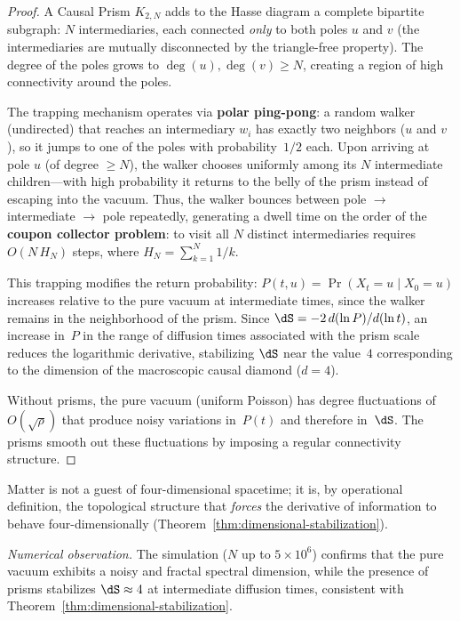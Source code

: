 \begin{proof}
A Causal Prism $K_{2,N}$ adds to the Hasse diagram a complete
bipartite subgraph: $N$ intermediaries, each connected
\emph{only} to both poles $u$ and $v$ (the intermediaries are
mutually disconnected by the triangle-free property). The
degree of the poles grows to $\deg(u), \deg(v) \geq N$, creating a
region of high connectivity around the poles.

The trapping mechanism operates via \textbf{polar ping-pong}:
a random walker (undirected) that reaches an intermediary
$w_i$ has exactly two neighbors ($u$ and $v$), so it jumps to
one of the poles with probability~$1/2$ each. Upon arriving at pole
$u$ (of degree $\geq N$), the walker chooses uniformly among its
$N$ intermediate children---with high probability it returns to the
belly of the prism instead of escaping into the vacuum. Thus, the
walker bounces between pole $\to$ intermediate $\to$ pole repeatedly,
generating a dwell time on the order of the \textbf{coupon
collector problem}: to visit all $N$ distinct intermediaries
requires $O(N\,H_N)$ steps, where $H_N =
\sum_{k=1}^{N} 1/k$.

This trapping modifies the return probability:
$P(t,u) = \Pr(X_t = u \mid X_0 = u)$ increases relative to the pure
vacuum at intermediate times, since the walker remains in the
neighborhood of the prism. Since $\dS = -2\,d(\ln P)/d(\ln t)$, an
increase in~$P$ in the range of diffusion times associated with the
prism scale reduces the logarithmic derivative, stabilizing $\dS$
near the value~$4$ corresponding to the dimension of the
macroscopic causal diamond ($d = 4$).

Without prisms, the pure vacuum (uniform Poisson) has degree
fluctuations of $O(\sqrt{\rho})$ that produce noisy variations
in~$P(t)$ and therefore in~$\dS$. The prisms smooth out these
fluctuations by imposing a regular connectivity structure.
\end{proof}

\begin{result}[title={Dimensional Stabilization by Matter}]
\label{res:dimensional-stabilization}
Matter is not a guest of four-dimensional spacetime; it is,
by operational definition, the topological structure that
\emph{forces} the derivative of information to behave
four-dimensionally
(Theorem~\ref{thm:dimensional-stabilization}).
\end{result}

\noindent\textit{Numerical observation.}\enspace
The simulation ($N$ up to $5 \times 10^6$) confirms that the pure
vacuum exhibits a noisy and fractal spectral dimension, while the
presence of prisms stabilizes $\dS \approx 4$ at intermediate
diffusion times, consistent with
Theorem~\ref{thm:dimensional-stabilization}.

